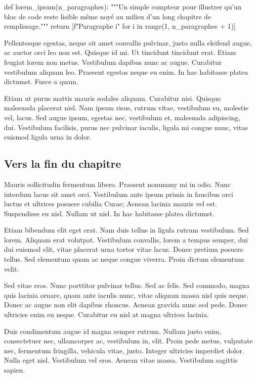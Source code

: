 \documentclass[theme=pringlea]{myrtillebook}
\begin{document}
\begin{pyblock}
def lorem_ipsum(n_paragraphes):
    """Un simple compteur pour illustrer qu'un bloc de code reste
    lisible même noyé au milieu d'un long chapitre de remplissage."""
    return [f"Paragraphe {i}" for i in range(1, n_paragraphes + 1)]
\end{pyblock}

Pellentesque egestas, neque sit amet convallis pulvinar, justo nulla eleifend augue, ac auctor orci leo non est. Quisque id mi. Ut tincidunt tincidunt erat. Etiam feugiat lorem non metus. Vestibulum dapibus nunc ac augue. Curabitur vestibulum aliquam leo. Praesent egestas neque eu enim. In hac habitasse platea dictumst. Fusce a quam.

Etiam ut purus mattis mauris sodales aliquam. Curabitur nisi. Quisque malesuada placerat nisl. Nam ipsum risus, rutrum vitae, vestibulum eu, molestie vel, lacus. Sed augue ipsum, egestas nec, vestibulum et, malesuada adipiscing, dui. Vestibulum facilisis, purus nec pulvinar iaculis, ligula mi congue nunc, vitae euismod ligula urna in dolor.

\subsection{Vers la fin du chapitre}

Mauris sollicitudin fermentum libero. Praesent nonummy mi in odio. Nunc interdum lacus sit amet orci. Vestibulum ante ipsum primis in faucibus orci luctus et ultrices posuere cubilia Curae; Aenean lacinia mauris vel est. Suspendisse eu nisl. Nullam ut nisl. In hac habitasse platea dictumst.

Etiam bibendum elit eget erat. Nam duis tellus in ligula rutrum vestibulum. Sed lorem. Aliquam erat volutpat. Vestibulum convallis, lorem a tempus semper, dui dui euismod elit, vitae placerat urna tortor vitae lacus. Donec pretium posuere tellus. Sed elementum quam ac neque congue viverra. Proin dictum elementum velit.

Sed vitae eros. Nunc porttitor pulvinar tellus. Sed ac felis. Sed commodo, magna quis lacinia ornare, quam ante iaculis nunc, vitae aliquam massa nisl quis neque. Donec ac augue non elit dapibus rhoncus. Aenean gravida nunc sed pede. Donec ultricies enim eu neque. Curabitur eu nisl at magna ultrices lacinia.

Duis condimentum augue id magna semper rutrum. Nullam justo enim, consectetuer nec, ullamcorper ac, vestibulum in, elit. Proin pede metus, vulputate nec, fermentum fringilla, vehicula vitae, justo. Integer ultricies imperdiet dolor. Nulla eget nisl. Vestibulum vel eros. Aenean vitae massa. Vestibulum sagittis sapien.
\end{document}
